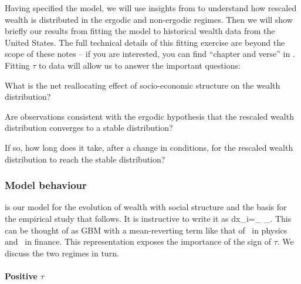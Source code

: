 Having specified the model, we will use insights from  to understand how rescaled wealth is distributed in the ergodic and non-ergodic regimes. Then we will show briefly our results from fitting the model to historical wealth data from the United States. The full technical details of this fitting exercise are beyond the scope of these notes -- if you are interested, you can find ``chapter and verse'' in \cite{BermanPetersAdamou2017}. Fitting $\tau$ to data will allow us to answer the important questions:
\bi
\item
What is the net reallocating effect of socio-economic structure on the wealth distribution?
\item
Are observations consistent with the ergodic hypothesis that the rescaled wealth distribution converges to a stable distribution?
\item
If so, how long does it take, after a change in conditions, for the rescaled wealth distribution to reach the stable distribution?
\ei


\subsubsection{Model behaviour}
 is our model for the evolution of wealth with social structure and the basis for the empirical study that follows. It is instructive to write it as
\be
dx_i=_{} \;\; _{}.
\ee
This can be thought of as GBM with a mean-reverting term like that of~\cite{UhlenbeckOrnstein1930} in physics and~\cite{Vasicek1977} in finance. This representation exposes the importance of the sign of $\tau$. We discuss the two regimes in turn.

\paragraph{Positive $\tau$}


